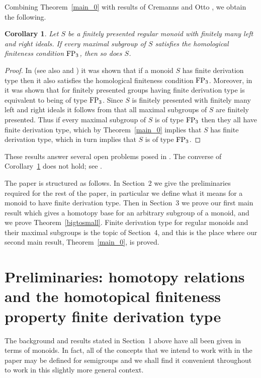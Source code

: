 \documentclass[11pt]{amsart}
\newtheorem{cor}{Corollary}
\theoremstyle{plain}
\begin{document}
Combining Theorem~\ref{main_0} with results of Cremanns and Otto \cite{Cremanns5}, \cite{Cremanns1} we obtain the following.

\begin{cor}\label{FP3}
Let $S$ be a finitely presented regular monoid with finitely many left and right ideals. If every maximal subgroup of $S$ satisfies the homological finiteness condition ${\rm FP}\sb 3$, then so does $S$.
\end{cor}
\begin{proof}
In \cite{Cremanns5} (see also \cite{Pride2} and \cite{Kilibarda1}) it was shown that if a monoid $S$ has finite derivation type then it also satisfies the homological finiteness condition ${\rm FP}_3$. Moreover, in \cite{Cremanns1} it was shown that for 
finitely presented groups having finite derivation type is equivalent to being of type ${\rm FP}_3$. 
Since $S$ is finitely presented with finitely many left and right ideals it follows from \cite{Ruskuc2} that all maximal subgroups of $S$ are finitely presented. 
Thus if every maximal subgroup of $S$ is of type ${\rm FP}_3$ then they all have finite derivation type, which by Theorem~\ref{main_0} implies that $S$ has finite derivation type, which in turn implies that $S$ is of type ${\rm FP}_3$. \end{proof}

These results answer several open problems posed in \cite[Open Problem~4.5]{Ruskuc2}. 
The converse of Corollary~\ref{FP3} does not hold; see \cite{Gray2}.

The paper is structured as follows. In Section~2 we give the preliminaries required for the rest of the paper, in particular we define what it means for a monoid to have finite derivation type. Then in Section~3 we prove our first main result which gives a homotopy base for an arbitrary subgroup of a monoid, and we prove Theorem~\ref{bigtosmall}. Finite derivation type for regular monoids and their maximal subgroups is the topic of Section~4, and this is the place where our second main result, Theorem~\ref{main_0}, is proved. 

\section{Preliminaries: homotopy relations and the homotopical finiteness property finite derivation type}

The background and results stated in Section~1 above have all been given in terms of monoids. In fact, all of the concepts that we intend to work with in the paper may be defined for semigroups and we shall find it convenient throughout to work in this slightly more general context. 
\end{document}
